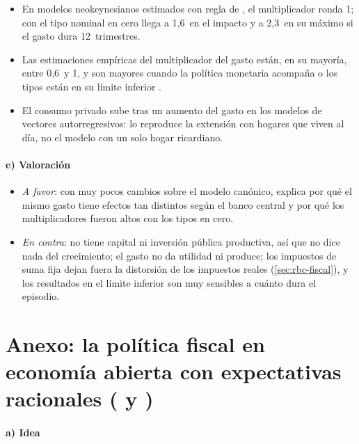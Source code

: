 \documentclass[11pt]{article}
\begin{document}
\begin{itemize}
\item En modelos neokeynesianos estimados con regla de , el multiplicador ronda 1; con el tipo nominal en cero llega a 1,6~en el impacto y a 2,3~en su máximo si el gasto dura 12~trimestres\nocite{ChristianoEichenbaumRebelo2011}.
\item Las estimaciones empíricas del multiplicador del gasto están, en su mayoría, entre 0,6~y 1, y son mayores cuando la política monetaria acompaña o los tipos están en su límite inferior\nocite{Ramey2019Ten} .
\item El consumo privado sube tras un aumento del gasto en los modelos de vectores autorregresivos\nocite{BlanchardPerotti2002Empirical}: lo reproduce la extensión con hogares que viven al día, no el modelo con un solo hogar ricardiano.
\end{itemize}

\paragraph{e) Valoración}

\begin{itemize}
\item \emph{A favor}: con muy pocos cambios sobre el modelo canónico, explica por qué el mismo gasto tiene efectos tan distintos según el banco central y por qué los multiplicadores fueron altos con los tipos en cero.
\item \emph{En contra}: no tiene capital ni inversión pública productiva, así que no dice nada del crecimiento; el gasto no da utilidad ni produce; los impuestos de suma fija dejan fuera la distorsión de los impuestos reales (\ref{sec:rbc-fiscal}), y los resultados en el límite inferior son muy sensibles a cuánto dura el episodio.
\end{itemize}

\section{Anexo: la política fiscal en economía abierta\cortetitulo{} con expectativas racionales ( y )}\label{anexo:corsetti-pesenti}

\paragraph{a) Idea}
\end{document}

